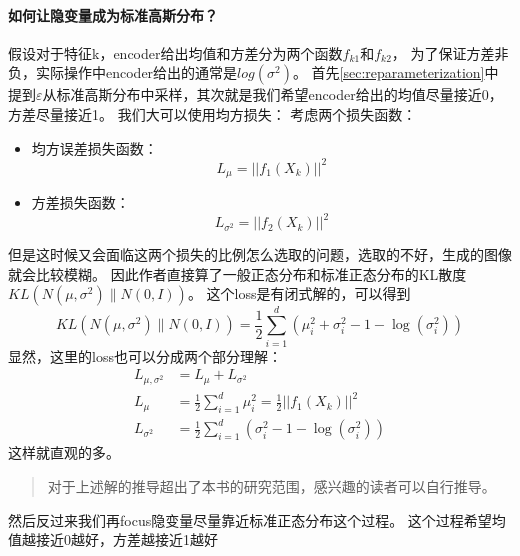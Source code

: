 \paragraph{如何让隐变量成为标准高斯分布？}
假设对于特征k，encoder给出均值和方差分为两个函数$f_{k1}$和$f_{k2}$，
为了保证方差非负，实际操作中encoder给出的通常是$log(\sigma^2)$。
首先\ref{sec:reparameterization}中提到$\varepsilon$从标准高斯分布中采样，其次就是我们希望encoder给出的均值尽量接近0，方差尽量接近1。\newline
我们大可以使用均方损失：\newline
考虑两个损失函数：  
\begin{itemize}
    \item 均方误差损失函数：
      \begin{equation}
        L_{\mu} = ||f_1(X_k)||^2
      \end{equation}
    \item 方差损失函数：
      \begin{equation}
        L_{\sigma^2} = ||f_2(X_k)||^2
      \end{equation}
\end{itemize}
但是这时候又会面临这两个损失的比例怎么选取的问题，选取的不好，生成的图像就会比较模糊。
因此作者直接算了一般正态分布和标准正态分布的KL散度$KL \left(N(\mu, \sigma^2) \Bigg\| N(0, I)\right)$。 \newline
这个loss是有闭式解的，可以得到
\begin{equation}
    KL \left(N(\mu, \sigma^2) \Bigg\| N(0, I)\right) = \frac{1}{2} \sum_{i=1}^{d} \left(\mu_i^2 + \sigma_i^2- 1 - \log(\sigma_i^2)\right)
\end{equation}
显然，这里的loss也可以分成两个部分理解：
\begin{align}
    L_{\mu,\sigma^2} &= L_{\mu} + L_{\sigma^2} \\
    L_{\mu} &= \frac{1}{2} \sum_{i=1}^{d} \mu_i^2 = \frac{1}{2} ||f_1(X_k)||^2 \\
    L_{\sigma^2} &= \frac{1}{2} \sum_{i=1}^{d} \left( \sigma_i^2 - 1 - \log(\sigma_i^2) \right)
\end{align}
这样就直观的多。
\begin{quotation}
    对于上述解的推导超出了本书的研究范围，感兴趣的读者可以自行推导。
\end{quotation}
然后反过来我们再focus隐变量尽量靠近标准正态分布这个过程。\newline
这个过程希望均值越接近0越好，方差越接近1越好
